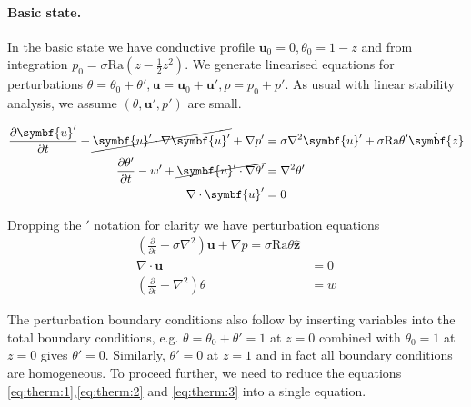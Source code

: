 \documentclass{jknotes}
\renewcommand{\u}{\symbf{u}}
\begin{document}
\paragraph{Basic state.}
In the basic state we have conductive profile $\u_0 = 0, \theta_0 = 1-z$ and
from integration $p_0 = \sigma \text{Ra}( z - \frac{1}{2}z^2)$. We generate
linearised equations for perturbations $\theta = \theta_0 + \theta', \u = \u_0
+ \u', p = p_0 + p'$. As usual with linear stability analysis, we assume
$(\theta, \u', p')$ are small.

\begin{align}
	\frac{\partial \u'}{\partial t} + \cancel{\u' \cdot \nabla \u'} + \nabla
	p' &= \sigma \nabla^2 \u' + \sigma \text{Ra} \theta' \hat{\symbf{z}} \\
	\frac{\partial \theta'}{\partial t} - w' + \cancel{\u' \cdot \nabla
	\theta'} &= \nabla^2 \theta' \\
	\nabla  \cdot \u' &= 0 
\end{align}

Dropping the $'$ notation for clarity we have perturbation equations
\begin{align}
	\left( \frac{\partial}{\partial t} - \sigma \nabla^2\right)\u + \nabla p =
	\sigma \text{Ra} \theta \hat{\symbf{z}} \label{eq:therm:1}\\
	\nabla \cdot \u &= 0 \label{eq:therm:2}\\
	\left( \frac{\partial}{\partial t} - \nabla^2\right)\theta &= w
	\label{eq:therm:3}
\end{align}

The perturbation boundary conditions also follow by inserting variables into
the total boundary conditions, e.g. $\theta = \theta_0 + \theta' = 1$ at $z=0$
combined with $\theta_0 = 1$ at $z=0$ gives $\theta' = 0$. Similarly, $\theta'
= 0$ at $z=1$ and in fact all boundary conditions are homogeneous. To proceed
further, we need to reduce the equations \eqref{eq:therm:1},\eqref{eq:therm:2}
and \eqref{eq:therm:3} into a single equation.
\end{document}
